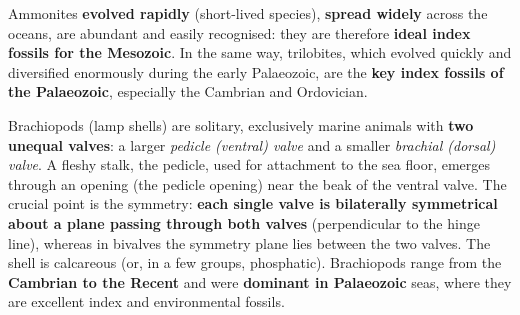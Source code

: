\documentclass[11pt]{article}
\newcommand{\cle}[1]{{\popxbold\color{popdark}#1}}
\newcounter{popsec}
\newcounter{popsub}
\newcommand{\courssub}[1]{%
  \stepcounter{popsub}%
  \par\vspace{9pt}\noindent{\popxbold\fontsize{11.5}{13}\selectfont\color{popink}{\color{poporange}\thepopsec.\thepopsub}\hspace{6pt}#1}\par\nopagebreak\vspace{4pt}
}
\newcommand{\legende}[1]{\par\vspace{6pt}{\popsemi\fontsize{9}{11.5}\selectfont\color{popmuted}#1}}
\begin{document}
\begin{popfigure}
\end{popfigure}

\begin{propriete}
Ammonites \textbf{evolved rapidly} (short-lived species), \textbf{spread widely} across the oceans, are abundant and easily recognised: they are therefore \textbf{ideal index fossils for the Mesozoic}. In the same way, trilobites, which evolved quickly and diversified enormously during the early Palaeozoic, are the \textbf{key index fossils of the Palaeozoic}, especially the Cambrian and Ordovician.
\end{propriete}

\courssub{Phylum Brachiopoda}

Brachiopods (lamp shells) are solitary, exclusively marine animals with \textbf{two unequal valves}: a larger \emph{pedicle (ventral) valve} and a smaller \emph{brachial (dorsal) valve}. A fleshy stalk, the \cle{pedicle}, used for attachment to the sea floor, emerges through an opening (the \cle{pedicle opening}) near the beak of the ventral valve. The crucial point is the symmetry: \textbf{each single valve is bilaterally symmetrical about a plane passing through both valves} (perpendicular to the hinge line), whereas in bivalves the symmetry plane lies between the two valves. The shell is calcareous (or, in a few groups, phosphatic). Brachiopods range from the \textbf{Cambrian to the Recent} and were \textbf{dominant in Palaeozoic} seas, where they are excellent index and environmental fossils.

\begin{popfigure}
\end{popfigure}
\end{document}
